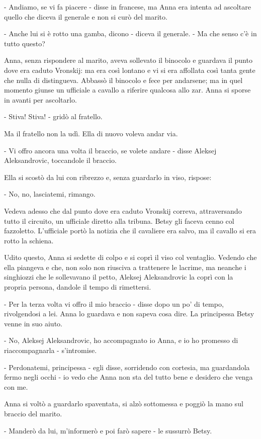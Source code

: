 - Andiamo, se vi fa piacere - disse in francese, ma Anna era intenta ad ascoltare quello che diceva il generale e non si curò del marito. 

- Anche lui si è rotto una gamba, dicono - diceva il generale. - Ma che senso c'è in tutto questo? 

Anna, senza rispondere al marito, aveva sollevato il binocolo e guardava il punto dove era caduto Vronskij: ma era così lontano e vi si era affollata così tanta gente che nulla di distingueva. Abbassò il binocolo e fece per andarsene; ma in quel momento giunse un ufficiale a cavallo a riferire qualcosa allo zar. Anna si sporse in avanti per ascoltarlo. 

- Stiva! Stiva! - gridò al fratello. 

Ma il fratello non la udì. Ella di nuovo voleva andar via. 

- Vi offro ancora una volta il braccio, se volete andare - disse Aleksej Aleksandrovic, toccandole il braccio. 

Ella si scostò da lui con ribrezzo e, senza guardarlo in viso, rispose: 

- No, no, lasciatemi, rimango. 

Vedeva adesso che dal punto dove era caduto Vronskij correva, attraversando tutto il circuito, un ufficiale diretto alla tribuna. Betsy gli faceva cenno col fazzoletto. L'ufficiale portò la notizia che il cavaliere era salvo, ma il cavallo si era rotto la schiena. 

Udito questo, Anna si sedette di colpo e si coprì il viso col ventaglio. Vedendo che ella piangeva e che, non solo non riusciva a trattenere le lacrime, ma neanche i singhiozzi che le sollevavano il petto, Aleksej Aleksandrovic la coprì con la propria persona, dandole il tempo di rimettersi. 

- Per la terza volta vi offro il mio braccio - disse dopo un po' di tempo, rivolgendosi a lei. Anna lo guardava e non sapeva cosa dire. La principessa Betsy venne in suo aiuto. 

- No, Aleksej Aleksandrovic, ho accompagnato io Anna, e io ho promesso di riaccompagnarla - s'intromise. 

- Perdonatemi, principessa - egli disse, sorridendo con cortesia, ma guardandola fermo negli occhi - io vedo che Anna non sta del tutto bene e desidero che venga con me. 

Anna si voltò a guardarlo spaventata, si alzò sottomessa e poggiò la mano sul braccio del marito. 

- Manderò da lui, m'informerò e poi farò sapere - le sussurrò Betsy. 


